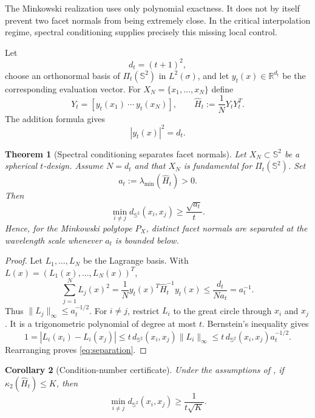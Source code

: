 \documentclass[11pt]{article}
\newtheorem{theorem}{Theorem}[section]
\newtheorem{corollary}[theorem]{Corollary}
\theoremstyle{definition}
\theoremstyle{remark}
\newcommand{\Sph}{\mathbb S}
\newcommand{\R}{\mathbb R}
\begin{document}
The Minkowski realization uses only polynomial exactness. It does not by itself prevent two facet normals from being extremely close. In the critical interpolation regime, spectral conditioning supplies precisely this missing local control.

Let
\[
d_t=(t+1)^2,
\]
choose an orthonormal basis of $\Pi_t(\Sph^2)$ in $L^2(\sigma)$, and let $y_t(x)\in\R^{d_t}$ be the corresponding evaluation vector. For $X_N=\{x_1,\dots,x_N\}$ define
\begin{equation}\label{eq:gram}
Y_t=[y_t(x_1)\ \cdots\ y_t(x_N)],
\qquad
\widehat H_t:=\frac1N Y_tY_t^T.
\end{equation}
The addition formula gives
\begin{equation}\label{eq:addition}
|y_t(x)|^2=d_t.
\end{equation}

\begin{theorem}[Spectral conditioning separates facet normals]\label{thm:separation}
Let $X_N\subset\Sph^2$ be a spherical $t$-design. Assume $N=d_t$ and that $X_N$ is fundamental for $\Pi_t(\Sph^2)$. Set
\[
a_t:=\lambda_{\min}(\widehat H_t)>0.
\]
Then
\begin{equation}\label{eq:separation}
\min_{i\ne j}d_{\Sph^2}(x_i,x_j)\ge\frac{\sqrt{a_t}}{t}.
\end{equation}
Hence, for the Minkowski polytope $P_X$, distinct facet normals are separated at the wavelength scale whenever $a_t$ is bounded below.
\end{theorem}

\begin{proof}
Let $L_1,\dots,L_N$ be the Lagrange basis. With $L(x)=(L_1(x),\dots,L_N(x))^T$,
\[
\sum_{j=1}^N L_j(x)^2
=\frac1N y_t(x)^T\widehat H_t^{-1}y_t(x)
\le\frac{d_t}{Na_t}=a_t^{-1}.
\]
Thus $\|L_j\|_\infty\le a_t^{-1/2}$. For $i\ne j$, restrict $L_i$ to the great circle through $x_i$ and $x_j$. It is a trigonometric polynomial of degree at most $t$. Bernstein's inequality gives
\[
1=|L_i(x_i)-L_i(x_j)|
\le t\,d_{\Sph^2}(x_i,x_j)\|L_i\|_\infty
\le t\,d_{\Sph^2}(x_i,x_j)a_t^{-1/2}.
\]
Rearranging proves \eqref{eq:separation}.
\end{proof}

\begin{corollary}[Condition-number certificate]\label{cor:condition-number}
Under the assumptions of , if $\kappa_2(\widehat H_t)\le K$, then
\begin{equation}\label{eq:condition-separation}
\min_{i\ne j}d_{\Sph^2}(x_i,x_j)\ge\frac1{t\sqrt K}.
\end{equation}
\end{corollary}
\end{document}
